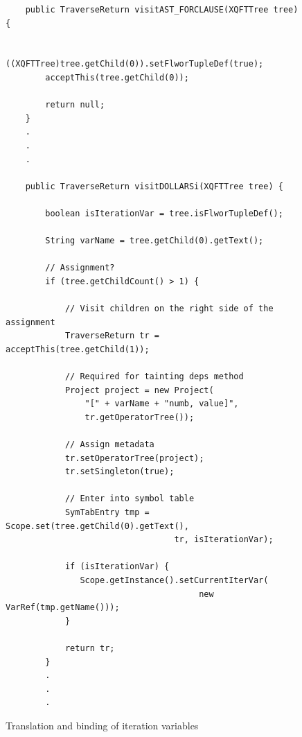 \newpage
\begin{figure}[!htp]
\begin{center}
\lstset{language=Java,numbers=left}
\begin{lstlisting}
    public TraverseReturn visitAST_FORCLAUSE(XQFTTree tree) {
        
        ((XQFTTree)tree.getChild(0)).setFlworTupleDef(true);
        acceptThis(tree.getChild(0));

        return null;
    }
    .
    .
    .
    
    public TraverseReturn visitDOLLARSi(XQFTTree tree) {
        
        boolean isIterationVar = tree.isFlworTupleDef();
        
        String varName = tree.getChild(0).getText();
        
        // Assignment?
        if (tree.getChildCount() > 1) {
            
            // Visit children on the right side of the assignment
            TraverseReturn tr = acceptThis(tree.getChild(1));
            
            // Required for tainting deps method
            Project project = new Project(
                "[" + varName + "numb, value]", 
                tr.getOperatorTree());

            // Assign metadata
            tr.setOperatorTree(project);
            tr.setSingleton(true);
            
            // Enter into symbol table
            SymTabEntry tmp = Scope.set(tree.getChild(0).getText(), 
                                  tr, isIterationVar);
            
            if (isIterationVar) {
               Scope.getInstance().setCurrentIterVar(
                                       new VarRef(tmp.getName()));
            }
            
            return tr;
        }
        .
        .
        .
\end{lstlisting}
  \caption{Translation and binding of iteration variables}
  \label{fig:impl:td:varbindfor}
\end{center}
\end{figure}

